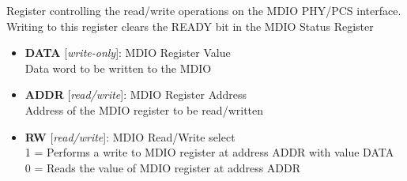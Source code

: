 \vspace{12pt}
Register controlling the read/write operations on the MDIO PHY/PCS interface. Writing to this register clears the READY bit in the MDIO Status Register

\vspace{12pt}
\noindent
{}

\begin{itemize}
\item \begin{small}
{\bf 
DATA
} [\emph{write-only}]: MDIO Register Value
\\
Data word to be written to the MDIO
\end{small}
\item \begin{small}
{\bf 
ADDR
} [\emph{read/write}]: MDIO Register Address
\\
Address of the MDIO register to be read/written
\end{small}
\item \begin{small}
{\bf 
RW
} [\emph{read/write}]: MDIO Read/Write select
\\
1 = Performs a write to MDIO register at address ADDR with value DATA\\				                0 = Reads the value of MDIO register at address ADDR
\end{small}
\end{itemize}
